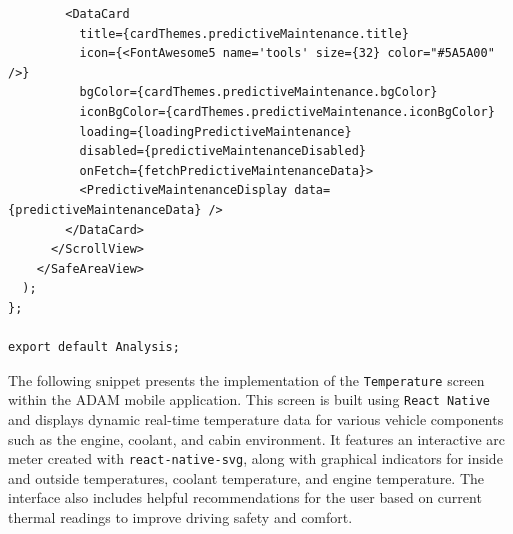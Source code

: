 \begin{lstlisting}
        <DataCard 
          title={cardThemes.predictiveMaintenance.title}
          icon={<FontAwesome5 name='tools' size={32} color="#5A5A00" />}
          bgColor={cardThemes.predictiveMaintenance.bgColor}
          iconBgColor={cardThemes.predictiveMaintenance.iconBgColor}
          loading={loadingPredictiveMaintenance}
          disabled={predictiveMaintenanceDisabled}
          onFetch={fetchPredictiveMaintenanceData}>
          <PredictiveMaintenanceDisplay data={predictiveMaintenanceData} />
        </DataCard>
      </ScrollView>
    </SafeAreaView>
  );
};

export default Analysis;
\end{lstlisting}
The following snippet presents the implementation of the \texttt{Temperature} screen within the ADAM mobile application. This screen is built using \texttt{React Native} and displays dynamic real-time temperature data for various vehicle components such as the engine, coolant, and cabin environment. It features an interactive arc meter created with \texttt{react-native-svg}, along with graphical indicators for inside and outside temperatures, coolant temperature, and engine temperature. The interface also includes helpful recommendations for the user based on current thermal readings to improve driving safety and comfort.

